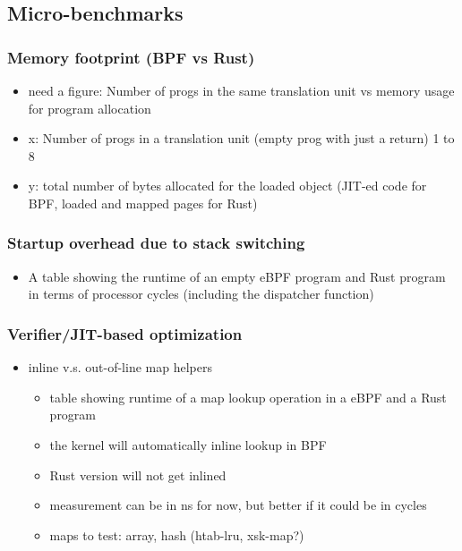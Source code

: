 \subsection{Micro-benchmarks}
\subsubsection{Memory footprint (BPF vs Rust)}
\begin{itemize}
    \item need a figure: Number of progs in the same translation unit vs
        memory usage for program allocation
    \item x: Number of progs in a translation unit (empty prog with just a
        return) 1 to 8
    \item y: total number of bytes allocated for the loaded object (JIT-ed code
        for BPF, loaded and mapped pages for Rust)
\end{itemize}

\subsubsection{Startup overhead due to stack switching}
\begin{itemize}
    \item A table showing the runtime of an empty eBPF program and Rust program
        in terms of processor cycles (including the dispatcher function)
\end{itemize}

\subsubsection{Verifier/JIT-based optimization}
\begin{itemize}
    \item inline v.s. out-of-line map helpers
        \begin{itemize}
            \item table showing runtime of a map lookup operation in a eBPF and
                a Rust program
            \item the kernel will automatically inline lookup in BPF
            \item Rust version will not get inlined
            \item measurement can be in ns for now, but better if it could be
                in cycles
            \item maps to test: array, hash (htab-lru, xsk-map?)
        \end{itemize}
\end{itemize}


